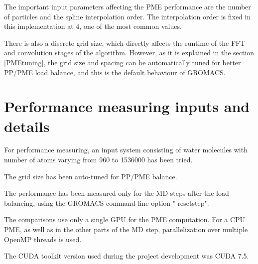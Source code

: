 \documentclass[12pt,a4paper]{report}
\newcommand{\draft}[1]{#1}
\begin{document}
The important input parameters affecting the PME performance are the number of particles and the spline interpolation order.
The interpolation order is fixed in this implementation at 4, one of the most common values.


There is also a discrete grid size, which directly affects the runtime of the FFT and convolution stages of the algorithm. However, as it is explained in the section \ref{PMEtuning}, the grid size and spacing can be automatically tuned for better PP/PME load balance, and this is the default behaviour of GROMACS. 

\section{Performance measuring inputs and details}

For performance measuring, an input system consisting of water molecules with number of atoms varying from 960 to 1536000 has been tried. 

The grid size has been auto-tuned for PP/PME balance.

The performance has been measured only for the MD steps after the load balancing, using the GROMACS command-line option "-resetstep".  

The comparisons use only a single GPU for the PME computation. For a CPU PME, as well as in the other parts of the MD step, parallelization over multiple OpenMP threads is used.

The CUDA toolkit version used during the project development was CUDA 7.5.


\end{document}
